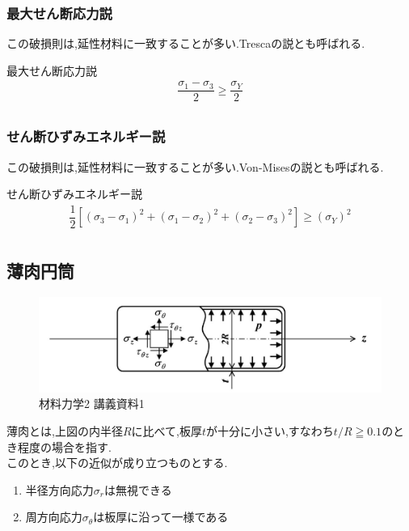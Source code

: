 \documentclass[a4paper]{jsarticle}
\begin{document}
\subsubsection{最大せん断応力説}
この破損則は,延性材料に一致することが多い.Trescaの説とも呼ばれる.
\begin{itembox}[l]{最大せん断応力説}
    \begin{eqnarray*}
        \dfrac{\sigma_1-\sigma_3}{2}\geq\dfrac{\sigma_Y}{2}\\
    \end{eqnarray*}
\end{itembox}
\subsubsection{せん断ひずみエネルギー説}
この破損則は,延性材料に一致することが多い.Von-Misesの説とも呼ばれる.
\begin{itembox}[l]{せん断ひずみエネルギー説}
    \begin{eqnarray*}
        \dfrac{1}{2}\left[\left(\sigma_3-\sigma_1\right)^2+\left(\sigma_1-\sigma_2\right)^2+\left(\sigma_2-\sigma_3\right)^2\right]\geq\left(\sigma_Y\right)^2\\
    \end{eqnarray*}
\end{itembox}
\subsection{薄肉円筒}
\begin{figure}[htbp]
    \begin{center}
        \includegraphics[width=150mm]{images/zairiki_image1.jpg}
        \caption{材料力学2 講義資料1}
    \end{center}
\end{figure}
薄肉とは,上図の内半径$R$に比べて,板厚$t$が十分に小さい,すなわち$t/R \geqq 0.1$のとき程度の場合を指す.\\
このとき,以下の近似が成り立つものとする.
\begin{enumerate}[(1)]
    \item 半径方向応力$\sigma_r$は無視できる
    \item 周方向応力$\sigma_\theta$は板厚に沿って一様である
\end{enumerate}
\end{document}
